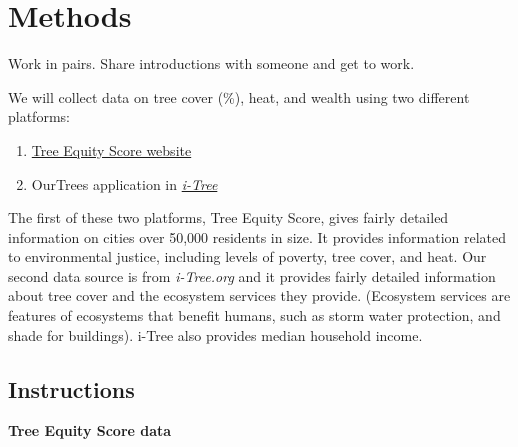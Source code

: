\documentclass[
  letterpaper,
  DIV=11,
  numbers=noendperiod]{scrreprt}
\providecommand{\tightlist}{%
  \setlength{\itemsep}{0pt}\setlength{\parskip}{0pt}}
\begin{document}
\section{Methods}\label{methods}

Work in pairs. Share introductions with someone and get to work.

We will collect data on tree cover (\%), heat, and wealth using two
different platforms:

\begin{enumerate}
\def\labelenumi{\arabic{enumi}.}
\tightlist
\item
  \href{https://treeequityscore.org/}{Tree Equity Score website}
\item
  OurTrees application in
  \href{https://www.itreetools.org/}{\emph{i-Tree}}
\end{enumerate}

The first of these two platforms, Tree Equity Score, gives fairly
detailed information on cities over 50,000 residents in size. It
provides information related to environmental justice, including levels
of poverty, tree cover, and heat. Our second data source is from
\emph{i-Tree.org} and it provides fairly detailed information about tree
cover and the ecosystem services they provide. (Ecosystem services are
features of ecosystems that benefit humans, such as storm water
protection, and shade for buildings). i-Tree also provides median
household income.

\subsection{Instructions}\label{instructions}

\textbf{Tree Equity Score data}
\end{document}
